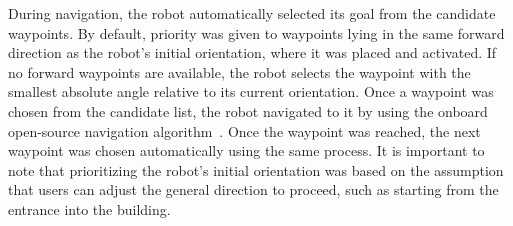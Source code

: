 During navigation, the robot automatically selected its goal from the candidate waypoints. 
By default, priority was given to waypoints lying in the same forward direction as the robot's initial orientation, where it was placed and activated. 
If no forward waypoints are available, the robot selects the waypoint with the smallest absolute angle relative to its current orientation. 
Once a waypoint was chosen from the candidate list, the robot navigated to it by using the onboard open-source navigation algorithm~\cite{guerreiro2019cabot}.
Once the waypoint was reached, the next waypoint was chosen automatically using the same process.
It is important to note that prioritizing the robot's initial orientation was based on the assumption that users can adjust the general direction to proceed, such as starting from the entrance into the building.

